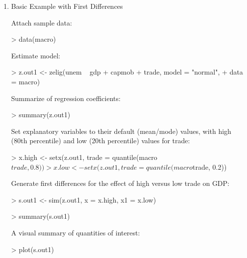 \begin{enumerate}
\item Basic Example with First Differences

Attach sample data: 
\begin{Schunk}
\begin{Sinput}
> data(macro)
\end{Sinput}
\end{Schunk}
Estimate model:  
\begin{Schunk}
\begin{Sinput}
> z.out1 <- zelig(unem ~ gdp + capmob + trade, model = "normal", 
+     data = macro)
\end{Sinput}
\end{Schunk}
Summarize of regression coefficients:  
\begin{Schunk}
\begin{Sinput}
> summary(z.out1)
\end{Sinput}
\end{Schunk}
Set explanatory variables to their default (mean/mode) values, with
high (80th percentile) and low (20th percentile) values for trade: 
\begin{Schunk}
\begin{Sinput}
> x.high <- setx(z.out1, trade = quantile(macro$trade, 0.8))
> x.low <- setx(z.out1, trade = quantile(macro$trade, 0.2))
\end{Sinput}
\end{Schunk}
Generate first differences for the effect of high versus low trade on
GDP: 
\begin{Schunk}
\begin{Sinput}
> s.out1 <- sim(z.out1, x = x.high, x1 = x.low)
\end{Sinput}
\end{Schunk}
\begin{Schunk}
\begin{Sinput}
> summary(s.out1)
\end{Sinput}
\end{Schunk}
A visual summary of quantities of interest:  
\begin{center}
\begin{Schunk}
\begin{Sinput}
> plot(s.out1)
\end{Sinput}
\end{Schunk}

\end{center}
\end{enumerate}
